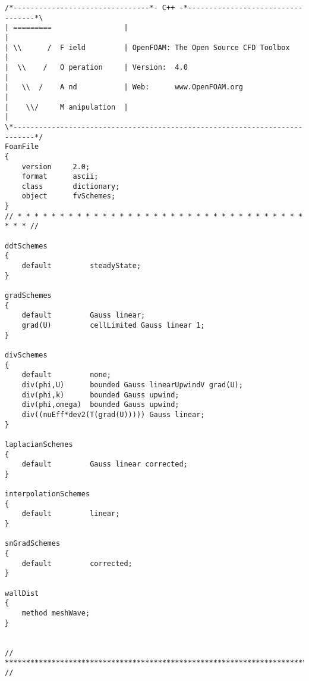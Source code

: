 \begin{footnotesize}
\begin{verbatim}
/*--------------------------------*- C++ -*----------------------------------*\
| =========                 |                                                 |
| \\      /  F ield         | OpenFOAM: The Open Source CFD Toolbox           |
|  \\    /   O peration     | Version:  4.0                                   |
|   \\  /    A nd           | Web:      www.OpenFOAM.org                      |
|    \\/     M anipulation  |                                                 |
\*---------------------------------------------------------------------------*/
FoamFile
{
    version     2.0;
    format      ascii;
    class       dictionary;
    object      fvSchemes;
}
// * * * * * * * * * * * * * * * * * * * * * * * * * * * * * * * * * * * * * //

ddtSchemes
{
    default         steadyState;
}

gradSchemes
{
    default         Gauss linear;
    grad(U)         cellLimited Gauss linear 1;
}

divSchemes
{
    default         none;
    div(phi,U)      bounded Gauss linearUpwindV grad(U);
    div(phi,k)      bounded Gauss upwind;
    div(phi,omega)  bounded Gauss upwind;
    div((nuEff*dev2(T(grad(U))))) Gauss linear;
}

laplacianSchemes
{
    default         Gauss linear corrected;
}

interpolationSchemes
{
    default         linear;
}

snGradSchemes
{
    default         corrected;
}

wallDist
{
    method meshWave;
}


// ************************************************************************* //

\end{verbatim}
\end{footnotesize}

